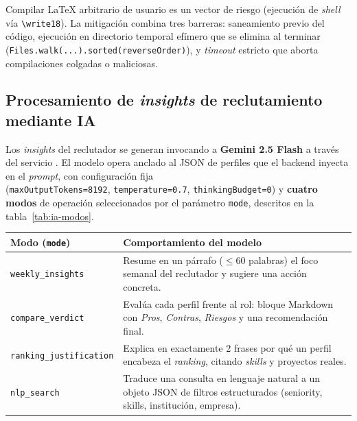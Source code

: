 \begin{AlertaSeguridad}
Compilar LaTeX arbitrario de usuario es un vector de riesgo (ejecución de \textit{shell}
vía \texttt{\textbackslash write18}). La mitigación combina tres barreras: saneamiento
previo del código, ejecución en directorio temporal efímero que se elimina al terminar
(\texttt{Files.walk(...).sorted(reverseOrder)}), y \textit{timeout} estricto que aborta
compilaciones colgadas o maliciosas.
\end{AlertaSeguridad}

\subsection{Procesamiento de \textit{insights} de reclutamiento mediante IA}
\label{subsec:seq_ia}

Los \textit{insights} del reclutador se generan invocando a \textbf{Gemini 2.5 Flash} a
través del servicio . El modelo opera anclado al JSON de
perfiles que el backend inyecta en el \textit{prompt}, con configuración fija \\
(\texttt{maxOutputTokens=8192}, \texttt{temperature=0.7}, \texttt{thinkingBudget=0}) y
\textbf{cuatro modos} de operación seleccionados por el parámetro \texttt{mode}, descritos
en la tabla~\ref{tab:ia-modos}.

\vspace{0.2cm}
\noindent
\renewcommand{\arraystretch}{1.3}
\fontsize{8.5}{10.2}\selectfont\sffamily
\begin{tabularx}{\textwidth}{|L{3.4cm}|Y|}
\hline
{}
\sffamily\textbf{Modo (\texttt{mode})} & \sffamily\textbf{Comportamiento del modelo} \\
\hline
\texttt{weekly\_insights} & Resume en un párrafo ($\le$60 palabras) el foco semanal del reclutador y sugiere una acción concreta. \\ \hline
{}
\texttt{compare\_verdict} & Evalúa cada perfil frente al rol: bloque Markdown con \textit{Pros}, \textit{Contras}, \textit{Riesgos} y una recomendación final. \\ \hline
\texttt{ranking\_justification} & Explica en exactamente 2 frases por qué un perfil encabeza el \textit{ranking}, citando \textit{skills} y proyectos reales. \\ \hline
{}
\texttt{nlp\_search} & Traduce una consulta en lenguaje natural a un objeto JSON de filtros estructurados (seniority, skills, institución, empresa). \\ \hline
\end{tabularx}
\label{tab:ia-modos}

